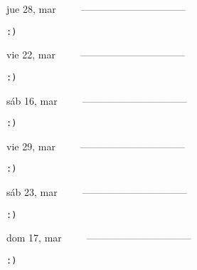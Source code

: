\documentclass[letterpaper,10pt]{article}
\begin{document}
\begin{multicols}{3}
{jue 28, mar\ \ \ \ \ --------------------------------}
\begin{flushright}\begin{small}\texttt{:)}\end{small}\end{flushright}
\vfill
{vie 22, mar\ \ \ \ \ --------------------------------}
\begin{flushright}\begin{small}\texttt{:)}\end{small}\end{flushright}\par
\vfill
{sáb 16, mar\ \ \ \ \ --------------------------------}
\begin{flushright}\begin{small}\texttt{:)}\end{small}\end{flushright}\par
\vfill
\end{multicols}
\vspace{1.05cm}

\begin{multicols}{3}
{vie 29, mar\ \ \ \ \ --------------------------------}
\begin{flushright}\begin{small}\texttt{:)}\end{small}\end{flushright}
\vfill
{sáb 23, mar\ \ \ \ \ --------------------------------}
\begin{flushright}\begin{small}\texttt{:)}\end{small}\end{flushright}\par
\vfill
{dom 17, mar\ \ \ \ \ --------------------------------}
\begin{flushright}\begin{small}\texttt{:)}\end{small}\end{flushright}\par
\vfill
\end{multicols}
\vspace{1.05cm}
\end{document}
